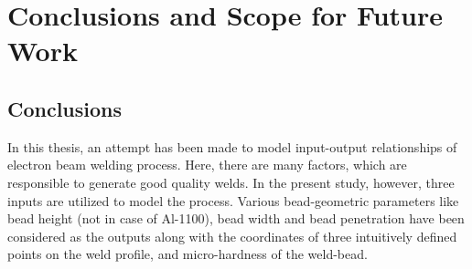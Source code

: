 \chapter{Conclusions and Scope for Future Work}
\section{Conclusions}
In this thesis, an attempt has been made to model input-output 
relationships of electron beam welding process. Here, there 
are many factors, which are responsible to generate good quality 
welds. In the
present study, however,  three inputs are utilized to model the 
process. Various bead-geometric parameters like bead height (not in 
case of Al-1100), bead width
and bead penetration have been considered as the outputs along with the
coordinates of three intuitively  defined points on the weld profile, 
and micro-hardness of the weld-bead.
